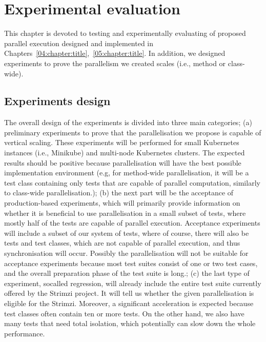 \chapter{Experimental evaluation}
\label{06:chapter:title}

This chapter is devoted to testing and experimentally evaluating of proposed parallel execution designed and implemented in
Chapters~\ref{04:chapter:title},~\ref{05:chapter:title}.
In addition, we designed experiments to prove the parallelism we created scales (i.e., method or class-wide).

\section{Experiments design}

The overall design of the experiments is divided into three main categories;
(a) preliminary experiments to prove that the parallelisation we propose is capable of vertical scaling.
These experiments will be performed for small Kubernetes instances (i.e., Minikube) and multi-node Kubernetes clusters.
The expected results should be positive because parallelisation will have the best possible implementation environment
(e.g, for method-wide parallelisation, it will be a test class containing only tests that are capable of parallel computation,
similarly to class-wide parallelisation.);
(b) the next part will be the acceptance of production-based experiments, which will primarily provide information on whether it is beneficial
to use parallelisation in a small subset of tests, where mostly half of the tests are capable of parallel execution.
Acceptance experiments will include a subset of our system of tests, where of course, there will also be tests and test classes,
which are not capable of parallel execution, and thus synchronisation will occur.
Possibly the parallelisation will not be suitable for acceptance experiments because most test suites consist of one or two test cases,
and the overall preparation phase of the test suite is long.;
(c) the last type of experiment, so\-called regression, will already include the entire test suite currently offered by the Strimzi project.
It will tell us whether the given parallelisation is eligible for the Strimzi.
Moreover, a significant acceleration is expected because test classes often contain ten or more tests.
On the other hand, we also have many tests that need total isolation, which potentially can slow down the whole performance.

